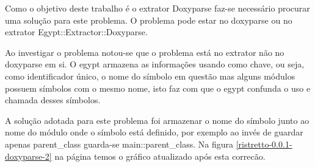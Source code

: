 Como o objetivo deste trabalho é o extrator Doxyparse faz-se necessário
procurar uma solução para este problema. O problema pode estar no doxyparse ou
no extrator Egypt::Extractor::Doxyparse.

Ao investigar o problema notou-se que o problema está no extrator não no
doxyparse em si. O egypt armazena as informações usando como chave, ou seja,
como identificador único, o nome do símbolo em questão mas alguns módulos
possuem símbolos com o mesmo nome, isto faz com que o egypt confunda o uso e
chamada desses símbolos.

A solução adotada para este problema foi armazenar o nome do símbolo junto ao
nome do módulo onde o símbolo está definido, por exemplo ao invés de guardar
apenas parent\_class guarda-se main::parent\_class.  Na figura
\ref{ristretto-0.0.1-doxyparse-2} na página
\pageref{ristretto-0.0.1-doxyparse-2} temos o gráfico atualizado após esta
correcão.

